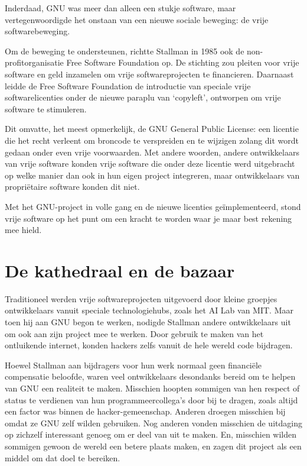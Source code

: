 \documentclass[
  a5paper,
  smalldemyvopaper,11pt,twoside,onecolumn,openright,extrafontsizes]{memoir}
\begin{document}
Inderdaad, GNU was meer dan alleen een stukje software, maar
vertegenwoordigde het onstaan van een nieuwe sociale beweging: de vrije
softwarebeweging.

Om de beweging te ondersteunen, richtte Stallman in 1985 ook de
non-profitorganisatie Free Software Foundation op. De stichting zou
pleiten voor vrije software en geld inzamelen om vrije softwareprojecten
te financieren. Daarnaast leidde de Free Software Foundation de
introductie van speciale vrije softwarelicenties onder de nieuwe paraplu
van `copyleft', ontworpen om vrije software te stimuleren.

Dit omvatte, het meest opmerkelijk, de GNU General Public License: een
licentie die het recht verleent om broncode te verspreiden en te
wijzigen zolang dit wordt gedaan onder even vrije voorwaarden. Met
andere woorden, andere ontwikkelaars van vrije software konden vrije
software die onder deze licentie werd uitgebracht op welke manier dan
ook in hun eigen project integreren, maar ontwikkelaars van propriëtaire
software konden dit niet.

Met het GNU-project in volle gang en de nieuwe licenties
geïmplementeerd, stond vrije software op het punt om een kracht te
worden waar je maar best rekening mee hield.

\section{De kathedraal en de bazaar}\label{de-kathedraal-en-de-bazaar}

Traditioneel werden vrije softwareprojecten uitgevoerd door kleine
groepjes ontwikkelaars vanuit speciale technologiehubs, zoals het AI Lab
van MIT. Maar toen hij aan GNU begon te werken, nodigde Stallman andere
ontwikkelaars uit om ook aan zijn project mee te werken. Door gebruik te
maken van het ontluikende internet, konden hackers zelfs vanuit de hele
wereld code bijdragen.

Hoewel Stallman aan bijdragers voor hun werk normaal geen financiële
compensatie beloofde, waren veel ontwikkelaars desondanks bereid om te
helpen van GNU een realiteit te maken. Misschien hoopten sommigen van
hen respect of status te verdienen van hun programmeercollega's door bij
te dragen, zoals altijd een factor was binnen de hacker-gemeenschap.
Anderen droegen misschien bij omdat ze GNU zelf wilden gebruiken. Nog
anderen vonden misschien de uitdaging op zichzelf interessant genoeg om
er deel van uit te maken. En, misschien wilden sommigen gewoon de wereld
een betere plaats maken, en zagen dit project als een middel om dat doel
te bereiken.
\end{document}
